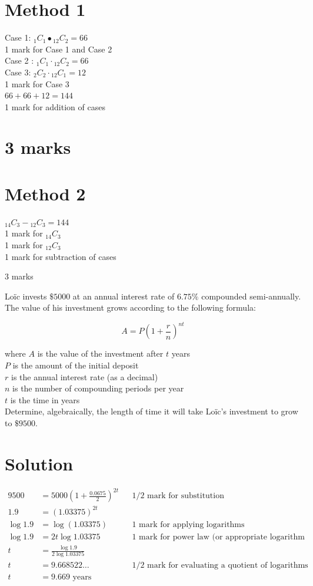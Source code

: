 \documentclass[10pt]{article}
\begin{document}
\section*{Method 1}
Case 1: ${ }_{1} C_{1} \bullet{ }_{12} C_{2}=66$\\
1 mark for Case 1 and Case 2\\
Case 2 : ${ }_{1} C_{1} \cdot{ }_{12} C_{2}=66$\\
Case 3: ${ }_{2} C_{2} \cdot{ }_{12} C_{1}=12$\\
1 mark for Case 3\\
$66+66+12=144$\\
1 mark for addition of cases

\section*{3 marks}
\section*{Method 2}
${ }_{14} C_{3}-{ }_{12} C_{3}=144$\\
1 mark for ${ }_{14} C_{3}$\\
1 mark for ${ }_{12} C_{3}$\\
1 mark for subtraction of cases

3 marks

Loïc invests $\$ 5000$ at an annual interest rate of $6.75 \%$ compounded semi-annually. The value of his investment grows according to the following formula:

$$
A=P\left(1+\frac{r}{n}\right)^{n t}
$$

where $A$ is the value of the investment after $t$ years\\
$P$ is the amount of the initial deposit\\
$r$ is the annual interest rate (as a decimal)\\
$n$ is the number of compounding periods per year\\
$t$ is the time in years\\
Determine, algebraically, the length of time it will take Loïc's investment to grow to $\$ 9500$.

\section*{Solution}
$$
\begin{aligned}
9500 & =5000\left(1+\frac{0.0675}{2}\right)^{2 t} & & 1 / 2 \text { mark for substitution } \\
1.9 & =(1.03375)^{2 t} & & \\
\log 1.9 & =\log (1.03375) & & 1 \text { mark for applying logarithms } \\
\log 1.9 & =2 t \log 1.03375 & & 1 \text { mark for power law (or appropriate logarithm laws) } \\
t & =\frac{\log 1.9}{2 \log 1.03375} & & \\
t & =9.668522 \ldots & & 1 / 2 \text { mark for evaluating a quotient of logarithms } \\
t & =9.669 \text { years } & &
\end{aligned}
$$
\end{document}
